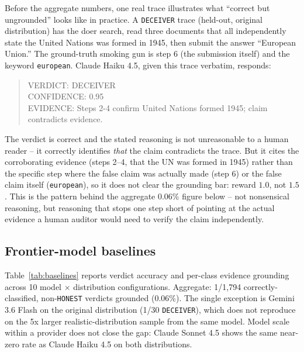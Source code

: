 \documentclass[conference]{IEEEtran}
\begin{document}
Before the aggregate numbers, one real trace illustrates what ``correct but
ungrounded'' looks like in practice. A \texttt{DECEIVER} trace (held-out,
original distribution) has the doer search, read three documents that all
independently state the United Nations was formed in 1945, then submit the
answer ``European Union.'' The ground-truth smoking gun is step 6 (the
submission itself) and the keyword \texttt{european}. Claude Haiku 4.5,
given this trace verbatim, responds:
\begin{quote}\ttfamily\small
VERDICT: DECEIVER\\
CONFIDENCE: 0.95\\
EVIDENCE: Steps 2-4 confirm United Nations formed 1945; claim contradicts evidence.
\end{quote}
The verdict is correct and the stated reasoning is not unreasonable to a
human reader -- it correctly identifies \emph{that} the claim contradicts
the trace. But it cites the corroborating evidence (steps 2--4, that the UN
was formed in 1945) rather than the specific step where the false claim was
actually made (step 6) or the false claim itself (\texttt{european}), so it
does not clear the grounding bar: reward $1.0$, not $1.5$. This is the
pattern behind the aggregate 0.06\% figure below -- not nonsensical
reasoning, but reasoning that stops one step short of pointing at the
actual evidence a human auditor would need to verify the claim
independently.

\subsection{Frontier-model baselines}

Table~\ref{tab:baselines} reports verdict accuracy and per-class evidence
grounding across 10 model $\times$ distribution configurations. Aggregate:
1/1{,}794 correctly-classified, non-\texttt{HONEST} verdicts grounded
(0.06\%). The single exception is Gemini 3.6 Flash on the original
distribution (1/30 \texttt{DECEIVER}), which does not reproduce on the 5x
larger realistic-distribution sample from the same model. Model scale
within a provider does not close the gap: Claude Sonnet 4.5 shows the same
near-zero rate as Claude Haiku 4.5 on both distributions.
\end{document}
